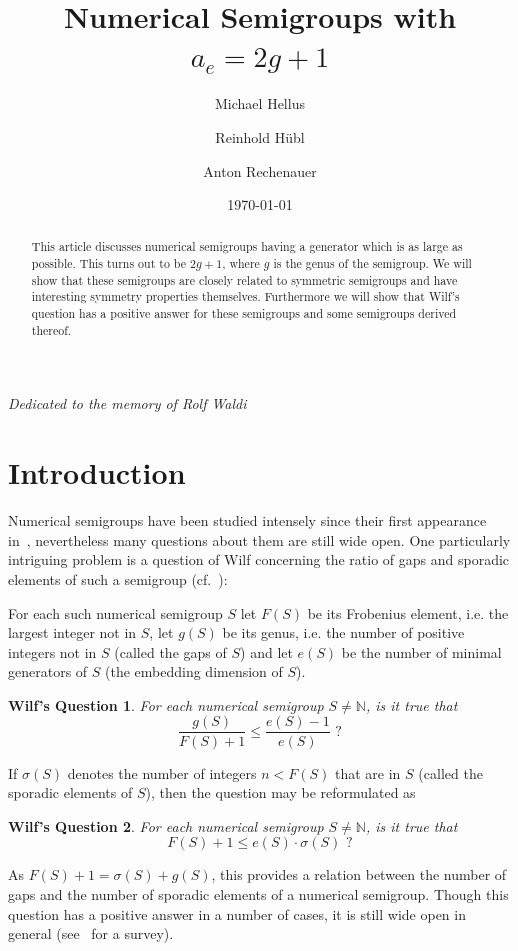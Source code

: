 \documentclass[a4paper,12pt,scrbook]{amsart}
\title{Numerical Semigroups with $a_e = 2g+1$}
\author{Michael Hellus}
\author{Reinhold H\"ubl}
\author{Anton Rechenauer}
\date{\today}
\def \N{\mathbb N}
\theoremstyle{plain}%
\newtheorem*{wilf}{Wilf's Question}
\theoremstyle{definition}
\begin{document}
\maketitle
\centerline{\textit{Dedicated to the memory of Rolf Waldi}}

\begin{abstract}
This article discusses numerical semigroups having a generator which is 
as large as possible. This turns out to be $2g+1$, where $g$ is the 
genus of the semigroup. We will show that these semigroups are closely 
related to symmetric semigroups and have interesting symmetry properties 
themselves. Furthermore we will show that Wilf's question has a positive 
answer for these semigroups and some semigroups derived thereof.
\end{abstract}


\section{Introduction}\label{sect:intro}

Numerical semigroups have been studied intensely since their first 
appearance in~\cite{Sy}, nevertheless many questions about them are still 
wide open. One particularly intriguing problem is a question of Wilf concerning 
the ratio of gaps and sporadic elements of such a semigroup (cf.~\cite{Wi}): 

For each such numerical semigroup $S$ let $F(S)$ be its Frobenius element, 
i.e. the largest integer not in $S$, let $g(S)$ be its genus, i.e. the number of 
positive integers not in $S$ (called the gaps of $S$) and let $e(S)$ be the 
number of minimal generators of $S$ (the embedding dimension of $S$). 

\begin{wilf}
For each numerical semigroup $S \neq \N$, is it true that
	\[ \frac {g(S)}{F(S)+1} \leq \frac {e(S)-1}{e(S)} \,\, ? \]
\end{wilf}

If $\sigma(S)$ denotes the number of integers $n < F(S)$ that 
are in $S$ (called the sporadic elements of $S$), then the question 
may be reformulated as

\begin{wilf}
For each numerical semigroup $S \neq \N$, is it true that 
	\[ F(S)+1 \leq e(S) \cdot \sigma(S) \,\, ? \]
\end{wilf}
 
As $F(S)+1 = \sigma(S) + g(S)$, this provides a relation between 
the number of gaps and the number of sporadic elements of a 
numerical semigroup. Though this question has a positive answer 
in a number of cases, it is still wide open in general 
(see~\cite{De} for a survey). 
\end{document}
